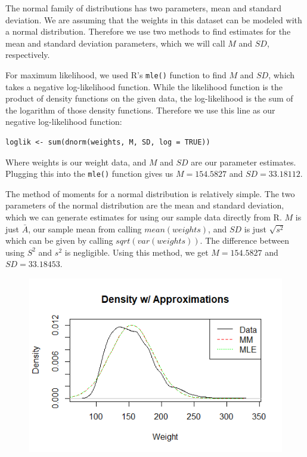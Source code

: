 \documentclass[12pt, a4paper, oneside]{report}
\begin{document}
\newpage
The normal family of distributions has two parameters, mean and standard deviation. We are assuming that the weights in this dataset can be modeled with a normal distribution. Therefore we use two methods to find estimates for the mean and standard deviation parameters, which we will call \(M\) and \(SD\), respectively.

For maximum likelihood, we used R's \lstinline{mle()} function to find \(M\) and \(SD\), which takes a negative log-likelihood function. While the likelihood function is the product of density functions on the given data, the log-likelihood is the sum of the logarithm of those density functions. Therefore we use this line as our negative log-likelihood function:

\begin{lstlisting}
loglik <- sum(dnorm(weights, M, SD, log = TRUE))
\end{lstlisting}

Where weights is our weight data, and \(M\) and \(SD\) are our parameter estimates. Plugging this into the \lstinline{mle()} function gives us \(M = 154.5827\) and \(SD = 33.18112\).

The method of moments for a normal distribution is relatively simple. The two parameters of the normal distribution are the mean and standard deviation, which we can generate estimates for using our sample data directly from R. \(M\) is just \(\bar{A}\), our sample mean from calling \(mean(weights)\), and \(SD\) is just \(\sqrt{s^2}\) which can be given by calling \(sqrt(var(weights))\). The difference between using \(S^2\) and \(s^2\) is negligible. Using this method, we get \(M = 154.5827\) and \(SD = 33.18453\).

\begin{figure}[h]
  \centering
  \includegraphics[width=0.8\linewidth]{normDensityA.png}
\end{figure}
\end{document}
